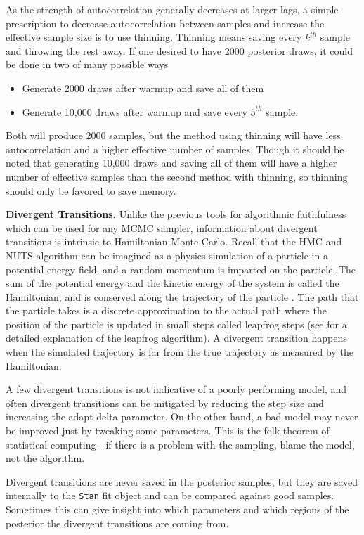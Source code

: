 \documentclass[11pt, oneside, openany]{scrbook}
\providecommand{\tightlist}{%
  \setlength{\itemsep}{0pt}\setlength{\parskip}{0pt}}
\begin{document}
As the strength of autocorrelation generally decreases at larger lags, a simple prescription to decrease autocorrelation between samples and increase the effective sample size is to use thinning. Thinning means saving every \(k^{th}\) sample and throwing the rest away. If one desired to have 2000 posterior draws, it could be done in two of many possible ways

\begin{itemize}
\tightlist
\item
  Generate 2000 draws after warmup and save all of them
\item
  Generate 10,000 draws after warmup and save every \(5^{th}\) sample.
\end{itemize}

Both will produce 2000 samples, but the method using thinning will have less autocorrelation and a higher effective number of samples. Though it should be noted that generating 10,000 draws and saving all of them will have a higher number of effective samples than the second method with thinning, so thinning should only be favored to save memory.

\textbf{Divergent Transitions.} Unlike the previous tools for algorithmic faithfulness which can be used for any MCMC sampler, information about divergent transitions is intrinsic to Hamiltonian Monte Carlo. Recall that the HMC and NUTS algorithm can be imagined as a physics simulation of a particle in a potential energy field, and a random momentum is imparted on the particle. The sum of the potential energy and the kinetic energy of the system is called the Hamiltonian, and is conserved along the trajectory of the particle \citep{stanref}. The path that the particle takes is a discrete approximation to the actual path where the position of the particle is updated in small steps called leapfrog steps (see \citet{leimkuhler2004simulating} for a detailed explanation of the leapfrog algorithm). A divergent transition happens when the simulated trajectory is far from the true trajectory as measured by the Hamiltonian.

A few divergent transitions is not indicative of a poorly performing model, and often divergent transitions can be mitigated by reducing the step size and increasing the adapt delta parameter. On the other hand, a bad model may never be improved just by tweaking some parameters. This is the folk theorem of statistical computing - if there is a problem with the sampling, blame the model, not the algorithm.

Divergent transitions are never saved in the posterior samples, but they are saved internally to the \texttt{Stan} fit object and can be compared against good samples. Sometimes this can give insight into which parameters and which regions of the posterior the divergent transitions are coming from.
\end{document}
